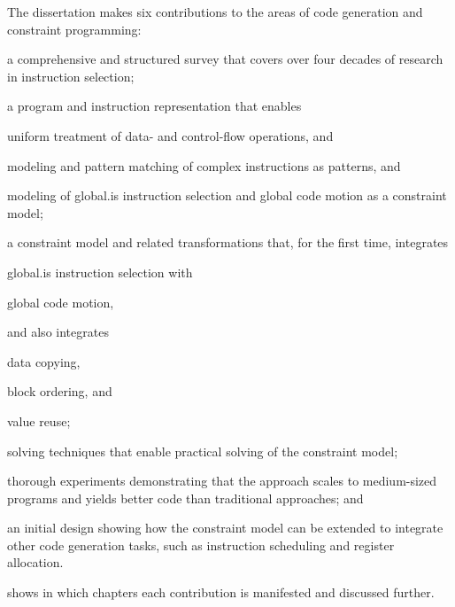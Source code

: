 The dissertation makes six contributions to the areas of \gls{code generation}
and \gls{constraint programming}:
%
\begin{contributions}
  \item {}
    a comprehensive and structured survey that covers over four decades of
    research in \gls{instruction selection};
  \item {}
    a \gls{program} and \gls{instruction} representation that enables
    \begin{contributions}
      \item {}
        uniform treatment of data- and control-flow \glspl{operation}, and
      \item {}
        modeling and pattern matching of complex \glspl{instruction} as
        \glspl{pattern}, and
      \item {}
        modeling of \gls{global.is} \gls{instruction selection} and \gls{global
          code motion} as a \gls{constraint model};
    \end{contributions}
  \item {}
    a \gls{constraint model} and related transformations that, for the first
    time, integrates
    \begin{contributions}
      \item {}
        \gls{global.is} \gls{instruction selection} with
      \item {}
        \gls{global code motion},
    \end{contributions}
    and also integrates
    \begin{contributions}[resume]
      \item {}
        \gls{data copying},
      \item {}
        \gls{block ordering}, and
      \item {}
        \gls{value reuse};
    \end{contributions}
  \item {}
    solving techniques that enable practical solving of the \gls{constraint
      model};
  \item {}
    thorough experiments demonstrating that the approach scales to medium-sized
    \glspl{program} and yields better code than traditional approaches; and
  \item {}
    an initial design showing how the \gls{constraint model} can be extended to
    integrate other \gls{code generation} tasks, such as \gls{instruction
      scheduling} and \gls{register allocation}.
\end{contributions}
%
 shows in which chapters each contribution
is manifested and discussed further.

